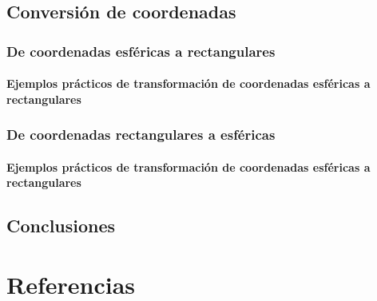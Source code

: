 \documentclass[letterpaper,14pt]{extreport} %
\begin{document}
    \section{Conversión de coordenadas}
      

      \subsection{De coordenadas esféricas a rectangulares}
          

          \subsubsection{Ejemplos prácticos de transformación de coordenadas esféricas a rectangulares}
          


      \subsection{De coordenadas rectangulares a esféricas}
          

          \subsubsection{Ejemplos prácticos de transformación de coordenadas esféricas a rectangulares}
          

    \section{Conclusiones}
      

  \chapter{Referencias}
    
\end{document}
